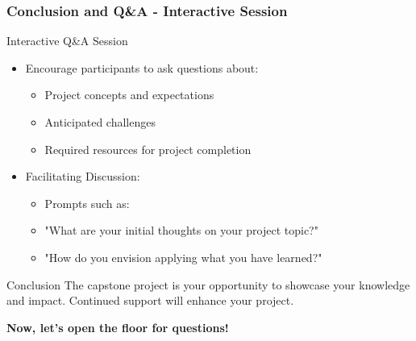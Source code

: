 \documentclass[aspectratio=169]{beamer}
\begin{document}
\begin{frame}[fragile]
  \frametitle{Conclusion and Q\&A - Interactive Session}

  \begin{block}{Interactive Q\&A Session}
    \begin{itemize}
      \item Encourage participants to ask questions about:
        \begin{itemize}
          \item Project concepts and expectations
          \item Anticipated challenges
          \item Required resources for project completion
        \end{itemize}
    \end{itemize}
  
    \begin{itemize}
      \item Facilitating Discussion:
        \begin{itemize}
          \item Prompts such as:
            \item "What are your initial thoughts on your project topic?"
            \item "How do you envision applying what you have learned?"
        \end{itemize}
    \end{itemize}
  \end{block}

  \begin{block}{Conclusion}
    The capstone project is your opportunity to showcase your knowledge and impact. Continued support will enhance your project.
  \end{block}

  \begin{center}
    \textbf{Now, let's open the floor for questions!}
  \end{center}
\end{frame}
\end{document}
